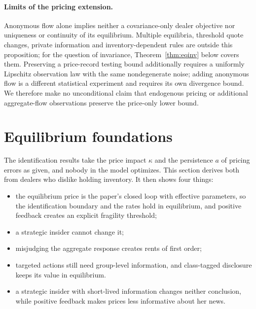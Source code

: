 \documentclass[12pt]{article}
\theoremstyle{definition}
\theoremstyle{remark}
\begin{document}
\paragraph{Limits of the pricing extension.} Anonymous flow alone implies neither a covariance-only dealer objective nor uniqueness or continuity of its equilibrium. Multiple equilibria, threshold quote changes, private information and inventory-dependent rules are outside this proposition; for the question of invariance, Theorem~\ref{thm:eqinv} below covers them. Preserving a price-record testing bound additionally requires a uniformly Lipschitz observation law with the same nondegenerate noise; adding anonymous flow is a different statistical experiment and requires its own divergence bound. We therefore make no unconditional claim that endogenous pricing or additional aggregate-flow observations preserve the price-only lower bound.

\section{Equilibrium foundations}\label{sec:equilibrium}

The identification results take the price impact $\kappa$ and the persistence $a$ of pricing errors as given, and nobody in the model optimizes. This section derives both from dealers who dislike holding inventory. It then shows four things:
\begin{itemize}[itemsep=1pt,topsep=2pt]
\item the equilibrium price is the paper's closed loop with effective parameters, so the identification boundary and the rates hold in equilibrium, and positive feedback creates an explicit fragility threshold;
\item a strategic insider cannot change it;
\item misjudging the aggregate response creates rents of first order;
\item targeted actions still need group-level information, and class-tagged disclosure keeps its value in equilibrium.
\item a strategic insider with short-lived information changes neither conclusion, while positive feedback makes prices less informative about her news.
\end{itemize}
\end{document}

